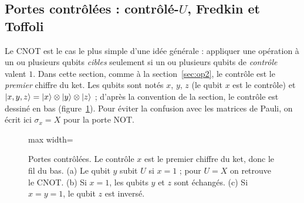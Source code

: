 \subsection{Portes contrôlées : contrôlé-\texorpdfstring{$U$}{U}, Fredkin et Toffoli}\label{sec:controlees}

Le CNOT est le cas le plus simple d'une idée générale : appliquer une opération à un ou
plusieurs qubits \emph{cibles} seulement si un ou plusieurs qubits de \emph{contrôle} valent $1$.
Dans cette section, comme à la section~\ref{sec:op2}, le contrôle est le \emph{premier} chiffre
du ket. Les qubits sont notés $x$, $y$, $z$ (le qubit $x$ est le contrôle) et
$|x,y,z\rangle=|x\rangle\otimes|y\rangle\otimes|z\rangle$ ; d'après la convention de la section, le
contrôle est dessiné en bas (figure~\ref{fig:controlees}). Pour éviter la confusion avec les
matrices de Pauli, on écrit ici $\sigma_x=X$ pour la porte NOT.

\begin{figure}[!ht]
\centering
\begin{adjustbox}{max width=\linewidth}
\end{adjustbox}
\caption{Portes contrôlées. Le contrôle $x$ est le premier chiffre du ket, donc le fil du bas.
(a) Le qubit $y$ subit $U$ si $x=1$ ; pour $U=X$ on retrouve le CNOT. (b) Si $x=1$, les qubits
$y$ et $z$ sont échangés. (c) Si $x=y=1$, le qubit $z$ est inversé.}
\label{fig:controlees}
\end{figure}

